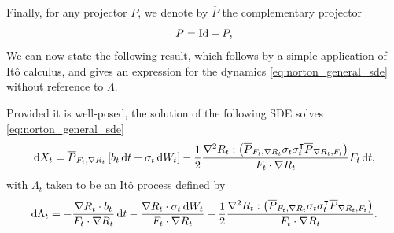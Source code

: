 Finally, for any projector $P$, we denote by $\overline{P}$ the complementary projector
\begin{equation}
    \label{eq:complementary_projector}
    \overline{P}=\mathrm{Id}-P,
\end{equation}
We can now state the following result, which follows by a simple application of Itô calculus, and gives an expression for the dynamics \eqref{eq:norton_general_sde} without reference to $\Lambda$.
\begin{prop}\label{prop:norton_sde}
   Provided it is well-posed, the solution of the following SDE solves \eqref{eq:norton_general_sde}
    \begin{equation}
        \label{eq:norton_general_sde_solved}
        \mathrm{d} X_t = \overline{P}_{F_t,\nabla R_t}\left[b_t\,\mathrm{d} t + \sigma_t\,\mathrm{d} W_t\right] - \frac{1}{2}\frac{\nabla^2 R_t : \left(\overline{P}_{F_t,\nabla R_t}\sigma_t \sigma_t^\intercal\overline{P}_{\nabla R_t,F_t}\right)}{F_t\cdot \nabla R_t}F_t\,\mathrm{d} t,
    \end{equation}
    with $\Lambda_t$ taken to be an Itô process defined by
    \begin{equation}
        \label{eq:norton_sde_multiplier_solved}
        \mathrm{d} \Lambda_t = -\frac{\nabla R_t \cdot b_t}{F_t\cdot \nabla R_t}\,\mathrm{d} t-\frac{\nabla R_t\cdot \sigma_t\,\mathrm{d} W_t}{F_t\cdot \nabla R_t}-\frac12\frac{\nabla^2 R_t : \left(\overline{P}_{F_t,\nabla R_t}\sigma_t\sigma_t^\intercal\overline{P}_{\nabla R_t,F_t}\right)}{F_t\cdot \nabla R_t}.
    \end{equation}
\end{prop}
